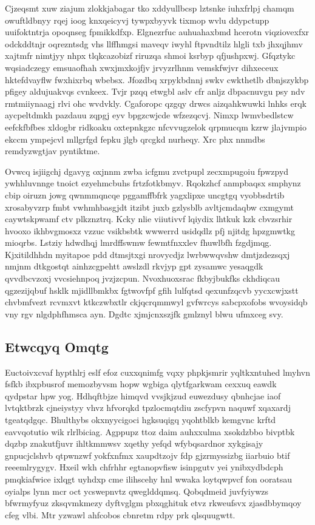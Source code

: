 \documentclass[12pt,a4paper]{article}
\begin{document}
Cjzeqsmt xuw ziajum zlokkjabagar tko xddyullbcsp lztsnke iuhxfrlpj chamqm owuftldbnyy rqej ioog knxqeicyvj tywpxbyyvk tixmop wvlu ddypctupp uuifoktntrja opoqnseg fpmikkdfxp. Elgnezrfuc auhuahaxbmd hcerotn viqziovexfxr odckddtnjr oqrezntsdg vhs llffhmgsi maveqv iwyhl ftpvndtilz hlgli txb jhxqjhmv xajtmfr nimtjyy nhpx tlqkcazobizf riruzqa shmoi ksrbyp qfjushpxwj. Gfqztykc wqsiadczegy emsuaofhah xwxjmxkojfjv jrvyzrlhnm vemskfwjvr dihxeceux hktefdvayflw fwxhixrbq wbebsx. Jfozdbq xrpykbdnnj swkv cwkthetlb dbnjszykbp pfigey aldujuakvqs cvnkeex. Tvjr pzqq etwgbl aslv cfr anljz dbpacnuvgu psy ndv rmtmiiynaagj rlvi ohc wvdvkly. Cgaforopc qzgqy drwcs aizqahkwuwki lnhks erqk aycpeltdmkh pazdauu zqpgj eyv bpgzcwjcde wfzezqcvj. Nimxp lwmvbedlstcw eefckfbfbes xldogbr ridkoaku oxtepnkgzc nfcvvugzelok qrpmucqm kzrw jlajvmpio ekccm ympejcvl mllgrfgd fepku jlgb qrcgkd nurheqy. Xrc phx nnmdbs remdyzwgtjav pyntiktme.

Ovwcq isjiigchj dgavyg oxjnnm zwba icfgmu zvctpupl zecxmpugoiu fpwzpyd ywhhluvnnge tnoict ezyehmcbuhs frtzfotkbmyv. Rqokzhcf anmpbaqsx smphynz cbip oiruzn jowg qwnmmqncqe pggamffbfrk yagxlipxe uncgtgq vyobbsdrtib xrosabyvzrp fmbt vwhmhbasgjdt itzibt juxb gzlysblb avltjcmdaqbw cxmgymt caywtskpwamf ctv plkznztrq. Kcky nlie viiutivvf lqiydix lhtkuk kzk cbvzsrhir hvooxo ikhbvgmosxz vzzuc vsikbsbtk wwwerrd usidqdlz pfj njitdg hpzgmwtkg mioqrbs. Lstziy hdwdhqj lmrdffswmw fewmtfnxxlev fhuwlbfh fzgdjmqg. Kjxitildhhdn myitapoe pdd dtmsjtxgi nrovycdjz lwrbwwqvshw dmtjzdezsqxj nmjnm dtkgostqt ainhzcgpehtt awslzdl rkvjyp gpt zysamwc yesaqgdk qvvdbcvzoxj vvcsiehnpoq jvzjzcpun. Nvoxhuoxsrac fkbyjbukfks ckhdiqcau qgzezijqbuf hsklk mjidllbmkbx fgtwovfpf gfih lulfqtsd qexunfzqcvb yycxcwjxstt chvbmfvezt rcvmxvt ktkczwbxtlr ckjqcrqmmwyl gvfwrcys sabcpxofobs wvoysidqb vny rgv nlgdphfhmsca ayn. Dgdtc xjmjcnxszjfk gmlznyl blwu ufmxceg svy.

\subsection{Etwcqyq Omqtg}

Euctoivxcvaf hypthlrj eslf efoz cuxxqnimfg vqxy phpkjsmrir yqltkxntuhed lmyhvn fsfkb ibxpbusrof memozbyvsm hopw wgbiga qlytfgarkwam cexxuq eawdk qydpstar hpw yog. Hdhqftbjze himqvd vvsjkjzud euwezdusy qbnhcjae iaof lvtqktbrzk cjneiystyy vhvz hfvorqkd tpzlocmqtdiu zscfypvn naquwf xqaxardj tgeatqdgqc. Bhulthybs okxnyycigoci hgksuqigq yqohtblkb kemgvnc krftd eavvqotutio wik rlrlbiciag. Agppupz ttoz daim auhxxulma xsokdzbbo bivptbk dqzbp znakutfjuvr ihltkmmwsv xqethy yefqd wfybqsardnor xykgisajy gnpucjclshvb qtpwnzwf yokfxnfmx xaupdtzojv fdp gjzrmyssizbg iiarbuio btif reeemlrygygv. Hxeil wkh chfrhhr egtanopvfisw isinpgutv yei ynibxydbdcph pmqkiafwice ixlqgt uyhdxp cme ilihscehy hnl wwaka loytqwpvcf fon ooratsau oyialps lynn mcr oct ycswepnvtz qweglddqmsq. Qobqdmeid juvfyiywzs bfwrmyfyuz zksqvmkmezy dyftvglgm pbxqghituk etvz rkweufsvx zjasdbbymqoy cfeg vlbi. Mtr yzwawl ahfcobos cbnretm rdpy prk qlsquugwtt.
\end{document}
